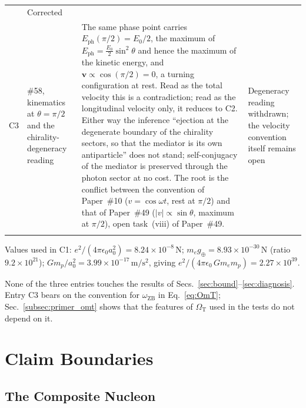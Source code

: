 \documentclass[%
 reprint, amsmath,amssymb, aps, prb, ]{revtex4-2}
\numberwithin{equation}{section}
\newcommand{\iphase}{\theta}
\newcommand{\omZB}{\omega_{\text{ZB}}}
\newcommand{\EphS}{E_{\text{ph}}}
\newcommand{\OmT}{\Omega_{\text{T}}}
\begin{document}
\begin{table}[t!]
\begin{tabular}{p{1.0cm}>{\raggedright\arraybackslash}p{2.3cm}p{8.6cm}>{\raggedright\arraybackslash}p{3.6cm}}
& Corrected \\
\addlinespace[0.3cm]
C3
& \#58, kinematics at $\iphase=\pi/2$ and the chirality-degeneracy reading
& The same phase point carries $\EphS(\pi/2)=E_0/2$, the maximum of $\EphS=\tfrac{E_0}{2}\sin^2\iphase$ and hence the maximum of the kinetic energy, and $\mathbf v\propto\cos(\pi/2)=0$, a turning configuration at rest. Read as the total velocity this is a contradiction; read as the longitudinal velocity only, it reduces to C2. Either way the inference ``ejection at the degenerate boundary of the chirality sectors, so that the mediator is its own antiparticle'' does not stand; self-conjugacy of the mediator is preserved through the photon sector at no cost. The root is the conflict between the convention of Paper~\#10 ($v=\cos\omega t$, rest at $\pi/2$) and that of Paper~\#49 ($|v|\propto\sin\iphase$, maximum at $\pi/2$), open task~(viii) of Paper~\#49.
& Degeneracy reading withdrawn; the velocity convention itself remains open \\
\addlinespace[0.2cm]
\bottomrule
\end{tabular}
\vspace{0.2cm}
\begin{minipage}{0.95\textwidth}
\justifying\footnotesize
Values used in C1: $e^2/(4\pi\epsilon_0 a_0^2)=8.24\times10^{-8}\,\mathrm{N}$; $m_e g_{\oplus}=8.93\times10^{-30}\,\mathrm{N}$ (ratio $9.2\times10^{21}$); $Gm_p/a_0^2=3.99\times10^{-17}\,\mathrm{m/s^2}$, giving $e^2/(4\pi\epsilon_0\,G m_e m_p)=2.27\times10^{39}$.
\end{minipage}
\end{table}

None of the three entries touches the results of Secs.~\ref{sec:bound}--\ref{sec:diagnosis}. Entry C3 bears on the convention for $\omZB$ in Eq.~\eqref{eq:OmT}; Sec.~\ref{subsec:primer_omt} shows that the features of $\OmT$ used in the tests do not depend on it.

\section{Claim Boundaries}
\label{sec:boundaries}

\subsection{The Composite Nucleon}
\label{subsec:composite}
\end{document}
